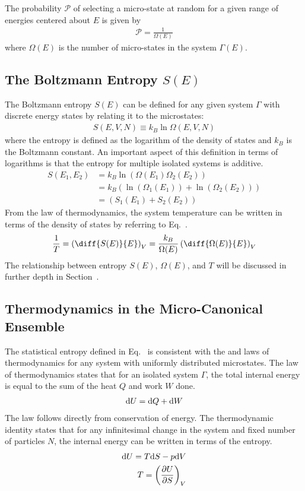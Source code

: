 The probability $\mathcal{P}$ of selecting a micro-state at random for a given range of energies centered about $E$ is given by
\begin{align}
    \mathcal{P} = \frac{1}{\Omega(E)}
\end{align}
where $\Omega(E)$ is the number of micro-states in the system $\Gamma(E)$.

\subsection{The Boltzmann Entropy $S(E)$}\label{entropy}
The Boltzmann entropy $S(E)$ can be defined for any given system $\Gamma$ with discrete energy states by relating it to the microstates:
\begin{align}\label{sdos}
    S(E,V,N) \equiv k_B \ln\Omega(E,V,N)
\end{align}
where the entropy is defined as the logarithm of the density of states and $k_B$ is the Boltzmann constant. An important aspect of this definition in terms of logarithms is that the entropy for multiple isolated systems is additive.
\begin{align}
    S(E_1,E_2) &= k_B \ln(\Omega(E_1)\Omega_2(E_2)) \\
    &= k_B \left( \ln(\Omega_1(E_1)) + \ln(\Omega_2(E_2))\right) \\
    &= \left( S_1(E_1) + S_2(E_2)\right)
\end{align}
From the  law of thermodynamics, the system temperature can be written in terms of the density of states by referring to Eq.~.
\begin{align}
    \frac{1}{T} = \left(\diff{S(E)}{E}\right)_V = \frac{k_B}{\Omega(E)}\left(\diff{\Omega(E)}{E}\right)_V
\end{align}
The relationship between entropy $S(E)$, $\Omega(E)$, and $T$ will be discussed in further depth in Section~.

\subsection{Thermodynamics in the Micro-Canonical Ensemble}\label{laws}
The statistical entropy defined in Eq.~ is consistent with the  and  laws of
thermodynamics for any system with uniformly distributed microstates.
The  law of thermodynamics states that for an isolated system $\Gamma$, the total internal energy is equal to the sum of the heat $Q$ and work $W$ done.
\begin{align}
    \text{d}U = \text{d}Q + \text{d}W
\end{align}
The  law follows directly from conservation of energy. The thermodynamic identity states that for any infinitesimal change in the system and fixed number of particles $N$, the internal energy can be written in terms of the entropy.
\begin{align}
    \text{d}U =  T\text{d}S - p\text{d}V \\
    T = \left(\pdv{U}{S}\right)_V
\end{align}

